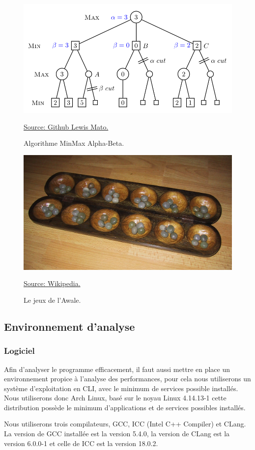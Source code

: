 \documentclass[
 aip,
 jmp,
 amsmath,amssymb,
 reprint
]{revtex4-1}
\begin{document}
\begin{figure}[H]
  \includegraphics[width=\linewidth, keepaspectratio=true]{alpha_beta.png}
  \centering
  \caption{Algorithme MinMax Alpha-Beta.\label{Fig:alpha_beta}}{\href{https://github.com/LewisMatos/MiniMaxTicTacToe}{Source: Github Lewis Mato.}}
\end{figure}
\begin{figure}[H]
  \includegraphics[width=\linewidth, keepaspectratio=true]{Awale.jpg}
  \centering
  \caption{Le jeux de l'Awale.\label{Fig:awale}}{\href{https://fr.wikipedia.org/wiki/Awale}{Source: Wikipedia.}}
\end{figure}

\subsection{Environnement d'analyse}
\subsubsection{Logiciel}
Afin d'analyser le programme efficacement, il faut aussi mettre en place un environnement propice à l'analyse des performances, pour cela nous utiliserons un système d'exploitation en CLI, avec le minimum de services possible installés. Nous utiliserons donc Arch Linux, basé sur le noyau Linux 4.14.13-1 cette distribution possède le minimum d'applications et de services possibles installés.\par
Nous utiliserons trois compilateurs, GCC, ICC (Intel C++ Compiler) et CLang. La version de GCC installée est la version 5.4.0, la version de CLang est la version 6.0.0-1 et celle de ICC est la version 18.0.2.
\end{document}
